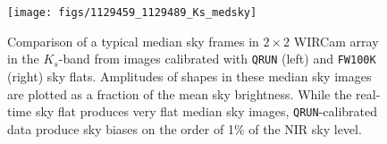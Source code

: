 \documentclass[iop]{emulateapj}
\newcommand{\ie}{\textit{i.e.,~}}
\newcommand{\todo}[1]{\textcolor{BurntOrange}{\textsf{#1}}} %
\newcommand{\mycomment}[1]{\textcolor{OliveGreen}{\textit{#1}}} %
\newcommand{\Fig}[1]{Fig.~\ref{fig:#1}}  %
\newcommand{\Sec}[1]{\S\ref{sec:#1}}  %
\begin{document}





\begin{figure}[t]
\centering
\texttt{[image: figs/1129459\_1129489\_Ks\_medsky]}
\caption{Comparison of a typical median sky frames in $2\times 2$ WIRCam array in the $K_s$-band from images calibrated with \texttt{QRUN} (left) and \texttt{FW100K} (right) sky flats.
Amplitudes of shapes in these median sky images are plotted as a fraction of the mean sky brightness.
While the real-time sky flat produces very flat median sky images, \texttt{QRUN}-calibrated data produce sky biases on the order of 1\% of the NIR sky level.
}
\label{fig:median_sky_images}
\end{figure}
\end{document}
